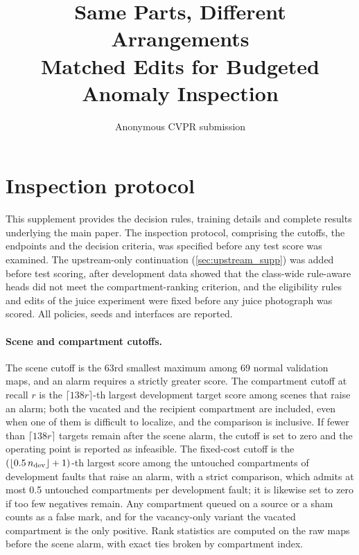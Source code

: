 \documentclass[10pt,twocolumn,letterpaper]{article}
\title{Same Parts, Different Arrangements\\Matched Edits for Budgeted Anomaly Inspection}
\author{Anonymous CVPR submission}
\begin{document}
\maketitlesupplementary

\section{Inspection protocol}
This supplement provides the decision rules, training details and complete results underlying the main paper. The inspection protocol, comprising the cutoffs, the endpoints and the decision criteria, was specified before any test score was examined. The upstream-only continuation (\cref{sec:upstream_supp}) was added before test scoring, after development data showed that the class-wide rule-aware heads did not meet the compartment-ranking criterion, and the eligibility rules and edits of the juice experiment were fixed before any juice photograph was scored. All policies, seeds and interfaces are reported.

\paragraph{Scene and compartment cutoffs.}
The scene cutoff is the 63rd smallest maximum among 69 normal validation maps, and an alarm requires a strictly greater score. The compartment cutoff at recall $r$ is the $\lceil 138r\rceil$-th largest development target score among scenes that raise an alarm; both the vacated and the recipient compartment are included, even when one of them is difficult to localize, and the comparison is inclusive. If fewer than $\lceil 138r\rceil$ targets remain after the scene alarm, the cutoff is set to zero and the operating point is reported as infeasible. The fixed-cost cutoff is the $(\lfloor0.5\,n_{\rm dev}\rfloor+1)$-th largest score among the untouched compartments of development faults that raise an alarm, with a strict comparison, which admits at most 0.5 untouched compartments per development fault; it is likewise set to zero if too few negatives remain. Any compartment queued on a source or a sham counts as a false mark, and for the vacancy-only variant the vacated compartment is the only positive. Rank statistics are computed on the raw maps before the scene alarm, with exact ties broken by compartment index.
\end{document}
